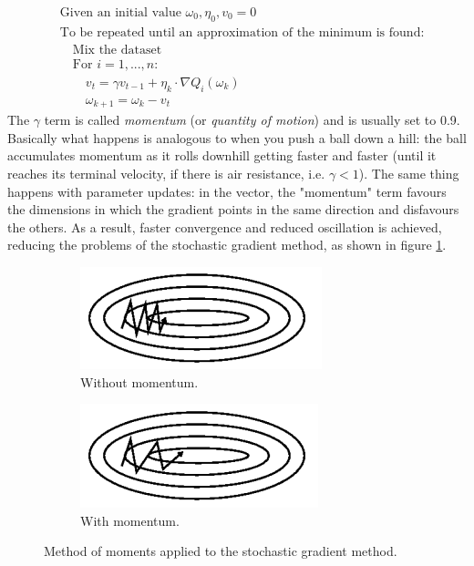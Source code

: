 \begin{align*}
    &\text{Given an initial value }\omega_0, \eta_0, v_0=0\\
    &\text{To be repeated until an approximation of the minimum is found:}\\
    &\quad\text{Mix the dataset}\\
    &\quad\text{For }i=1,...,n:\\
    & \quad\quad v_t=\gamma v_{t-1}+\eta_k\cdot \nabla Q_i(\omega_k)\\
    &\quad\quad\omega_{k+1}=\omega_k - v_t
\end{align*}
The $\gamma$ term is called \textit{momentum} (or \textit{quantity of motion}) and is usually set to 0.9.\\
Basically what happens is analogous to when you push a ball down a hill: the ball accumulates momentum
as it rolls downhill getting faster and faster (until it reaches its terminal velocity, if there is
air resistance, i.e. $\gamma<1$). 
The same thing happens with parameter updates: in the vector, the "momentum" term favours the dimensions in which the gradient points in the same direction and disfavours the others. As a result, faster convergence and reduced oscillation is achieved, reducing the problems of the stochastic gradient method, as shown in figure \ref{MomentumMethod}.

\begin{figure}[h]
\centering
\begin{subfigure}{.5\textwidth}
  \centering
  \includegraphics[width=\linewidth]{images/Training (teoria)/SGD Momentum a.PNG}
  \caption{Without momentum.}
\end{subfigure}%
\begin{subfigure}{.5\textwidth}
  \centering
  \includegraphics[width=\linewidth]{images/Training (teoria)/SGD Momentum b.PNG}
  \caption{With momentum.}
\end{subfigure}
\caption{Method of moments applied to the stochastic gradient method. \cite{ruder_2022}}
\label{MomentumMethod}
\end{figure}

